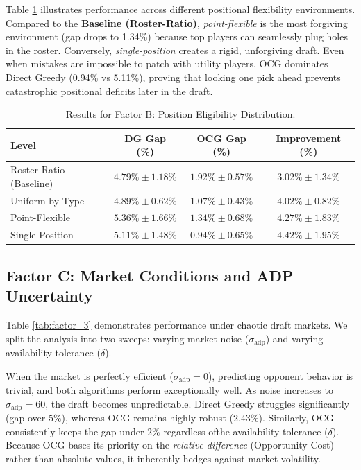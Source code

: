\documentclass[11pt,a4paper]{article}
\begin{document}
Table \ref{tab:factor_2} illustrates performance across different positional flexibility environments. Compared to the \textbf{Baseline (Roster-Ratio)}, \textit{point-flexible} is the most forgiving environment (gap drops to 1.34\%) because top players can seamlessly plug holes in the roster. Conversely, \textit{single-position} creates a rigid, unforgiving draft. Even when mistakes are impossible to patch with utility players, OCG dominates Direct Greedy (0.94\% vs 5.11\%), proving that looking one pick ahead prevents catastrophic positional deficits later in the draft.

\begin{table}[H]
\centering
\caption{Results for Factor B: Position Eligibility Distribution.}
\label{tab:factor_2}
\begin{tabular}{lccc}
\toprule
Level & DG Gap (\%) & OCG Gap (\%) & Improvement (\%) \\
\midrule
Roster-Ratio (Baseline) & $4.79\% \pm 1.18\%$ & $\mathbf{1.92\% \pm 0.57\%}$ & $3.02\% \pm 1.34\%$ \\
Uniform-by-Type & $4.89\% \pm 0.62\%$ & $\mathbf{1.07\% \pm 0.43\%}$ & $4.02\% \pm 0.82\%$ \\
Point-Flexible & $5.36\% \pm 1.66\%$ & $\mathbf{1.34\% \pm 0.68\%}$ & $4.27\% \pm 1.83\%$ \\
Single-Position & $5.11\% \pm 1.48\%$ & $\mathbf{0.94\% \pm 0.65\%}$ & $\mathbf{4.42\% \pm 1.95\%}$ \\
\bottomrule
\end{tabular}
\end{table}

\subsection{Factor C: Market Conditions and ADP Uncertainty}

Table \ref{tab:factor_3} demonstrates performance under chaotic draft markets. We split the analysis into two sweeps: varying market noise ($\sigma_{\text{adp}}$) and varying availability tolerance ($\delta$).

When the market is perfectly efficient ($\sigma_{\text{adp}}=0$), predicting opponent behavior is trivial, and both algorithms perform exceptionally well. As noise increases to $\sigma_{\text{adp}}=60$, the draft becomes unpredictable. Direct Greedy struggles significantly (gap over $5\%$), whereas OCG remains highly robust ($2.43\%$). Similarly, OCG consistently keeps the gap under $2\%$ regardless ofthe availability tolerance ($\delta$). Because OCG bases its priority on the \textit{relative difference} (Opportunity Cost) rather than absolute values, it inherently hedges against market volatility.
\end{document}
